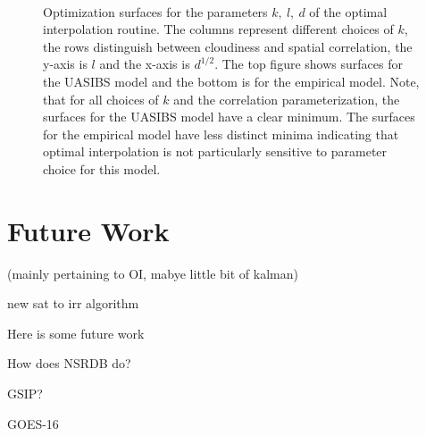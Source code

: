 \begin{figure}[p]
\centering
\captionsetup[subfigure]{labelformat=empty}
\vspace{-1em} \\
\caption[Optimization surfaces for OI parameters]{Optimization
  surfaces for the parameters $k,\: l,\: d$ of the optimal
  interpolation routine. The columns represent different choices of
  $k$, the rows distinguish between cloudiness and spatial
  correlation, the y-axis is $l$ and the x-axis is $d^{1/2}$. The top
  figure shows surfaces for the UASIBS model and the bottom is for the
  empirical model. Note, that for all choices of $k$ and the
  correlation parameterization, the surfaces for the UASIBS model have
  a clear minimum. The surfaces for the empirical model have less
  distinct minima indicating that optimal interpolation is not
  particularly sensitive to parameter choice for this model.}
\label{fig:paramopt}
\end{figure}


\section{Future Work}
(mainly pertaining to OI, mabye little bit of kalman)

new sat to irr algorithm

Here is some future work

How does NSRDB do?

GSIP?

GOES-16
